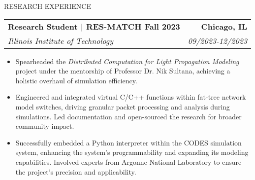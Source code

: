 \documentclass{resume} %
\begin{document}
\vspace{-5pt} %
\begin{rSection}{RESEARCH EXPERIENCE}

   \begin{tabularx}{\textwidth}{@{}X r}
      \textbf{Research Student | RES-MATCH Fall 2023} & \textbf{Chicago, IL} \\
      \textit{Illinois Institute of Technology} & \textit{09/2023-12/2023} \\
   \end{tabularx}


   \begin{minipage}[t]{1\textwidth}
      \begin{itemize}[left=0pt, nosep, before=\vspace{-0.5\baselineskip}]
         \item \small Spearheaded the \textit{Distributed Computation for Light Propagation Modeling} project under the mentorship of Professor Dr. Nik Sultana, achieving a holistic overhaul of simulation efficiency. 
         \item \small Engineered and integrated virtual C/C++ functions within fat-tree network model switches, driving granular packet processing and analysis during simulations. Led documentation and open-sourced the research for broader community impact.
         \item \small Successfully embedded a Python interpreter within the CODES simulation system, enhancing the system's programmability and expanding its modeling capabilities. Involved experts from Argonne National Laboratory to ensure the project's precision and applicability.
      \end{itemize}
   \end{minipage}


\end{rSection}
\end{document}

